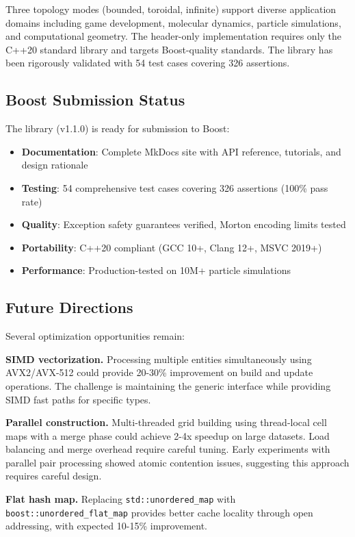 \documentclass[11pt]{article}
\begin{document}
Three topology modes (bounded, toroidal, infinite) support diverse application domains including game development, molecular dynamics, particle simulations, and computational geometry. The header-only implementation requires only the C++20 standard library and targets Boost-quality standards. The library has been rigorously validated with 54 test cases covering 326 assertions.

\subsection{Boost Submission Status}

The library (v1.1.0) is ready for submission to Boost:
\begin{itemize}
\item \textbf{Documentation}: Complete MkDocs site with API reference, tutorials, and design rationale
\item \textbf{Testing}: 54 comprehensive test cases covering 326 assertions (100\% pass rate)
\item \textbf{Quality}: Exception safety guarantees verified, Morton encoding limits tested
\item \textbf{Portability}: C++20 compliant (GCC 10+, Clang 12+, MSVC 2019+)
\item \textbf{Performance}: Production-tested on 10M+ particle simulations
\end{itemize}

\subsection{Future Directions}

Several optimization opportunities remain:

\textbf{SIMD vectorization.} Processing multiple entities simultaneously using AVX2/AVX-512 could provide 20-30\% improvement on build and update operations. The challenge is maintaining the generic interface while providing SIMD fast paths for specific types.

\textbf{Parallel construction.} Multi-threaded grid building using thread-local cell maps with a merge phase could achieve 2-4x speedup on large datasets. Load balancing and merge overhead require careful tuning. Early experiments with parallel pair processing showed atomic contention issues, suggesting this approach requires careful design.

\textbf{Flat hash map.} Replacing \texttt{std::unordered\_map} with \texttt{boost::unordered\_flat\_map} provides better cache locality through open addressing, with expected 10-15\% improvement.
\end{document}
